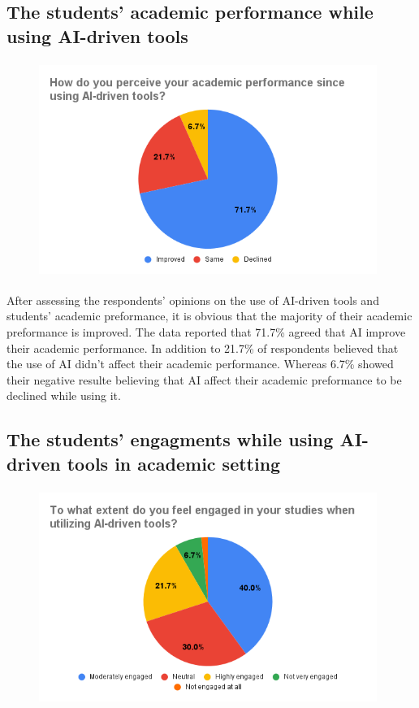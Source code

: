 \subsection{The students' academic performance while using AI-driven tools}
\begin{figure}[h]
	\centering
	\includegraphics[width=11cm, height=7cm]{./chap4/figures/prf}
\end{figure}
After assessing the respondents’ opinions on the use of AI-driven tools
and students' academic preformance, it is obvious that the majority
of their academic preformance is improved. The data reported that
71.7\% agreed that AI improve their academic performance. In addition to
21.7\% of respondents believed that the use of AI didn't affect their academic
performance. Whereas 6.7\% showed their negative resulte believing that AI
affect their academic preformance to be declined while using it.

\subsection{The students' engagments while using AI-driven tools in academic setting}

\begin{figure}[H]
	\centering
	\includegraphics[width=11cm, height=7cm]{./chap4/figures/engagment}
\end{figure}


